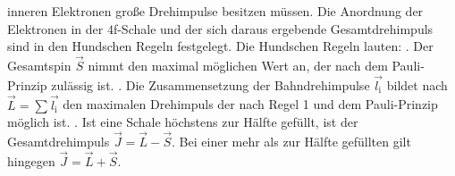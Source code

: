 inneren Elektronen große Drehimpulse besitzen müssen. Die Anordnung der Elektronen in der $4$f-Schale und der sich daraus ergebende Gesamtdrehimpuls sind in den Hundschen Regeln
festgelegt.
\newpage
\noindent
Die Hundschen Regeln lauten:
\newline {}. Der Gesamtspin $\vec{S}$ nimmt den maximal möglichen Wert an, der nach dem Pauli-Prinzip zulässig ist. 
. Die Zusammensetzung der Bahndrehimpulse $\vec{l_\text{i}}$ bildet nach $\vec{L} = \sum \vec{l_\text{i}}$ den maximalen Drehimpuls der nach Regel 1 und dem Pauli-Prinzip möglich ist.
. Ist eine Schale höchstens zur Hälfte gefüllt, ist der Gesamtdrehimpuls $\vec{J} = \vec{L} - \vec{S}$. Bei einer mehr als zur Hälfte gefüllten gilt hingegen
$\vec{J} = \vec{L} + \vec{S}$.

